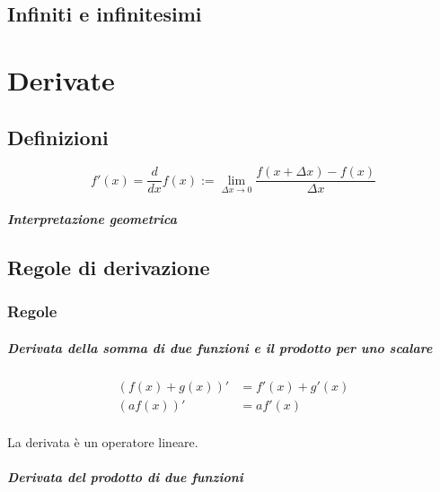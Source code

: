 \section{Infiniti e infinitesimi}

\chapter{Derivate}

\section{Definizioni}
\begin{definition}[Derivata]
\begin{equation}
  f'(x) = \dfrac{d }{dx} f(x) := \lim_{\Delta x \rightarrow 0} \dfrac{f(x+\Delta x) - f(x)}{\Delta x}
\end{equation}
\end{definition}

\paragraph{Interpretazione geometrica}

\section{Regole di derivazione}
\subsection{Regole}
\paragraph{Derivata della somma di due funzioni e il prodotto per uno scalare}
\begin{equation}
\begin{aligned}
    (f(x) + g(x))' & = f'(x) + g'(x) \\
    (a f(x))' & = a f'(x) \\
\end{aligned}
\end{equation}
\begin{property} La derivata è un operatore lineare.
\end{property}

\paragraph{Derivata del prodotto di due funzioni}
